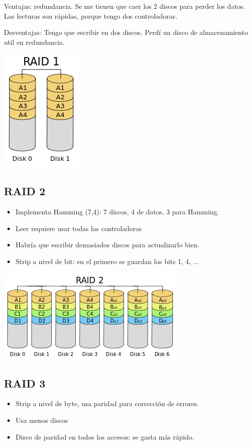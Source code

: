 Ventajas: redundancia. Se me tienen que caer los 2 discos para perder los datos. Las lecturas son rápidas, porque tengo dos controladoras.


Desventajas: Tengo que escribir en dos discos. Perdí un disco de almacenamiento util en redundancia.

\includegraphics[scale=0.82]{imagenes/raid1}

\subsection{RAID 2}
\begin{itemize}
\item Implementa Hamming (7,4): 7 discos, 4 de datos, 3 para Hamming.
\item Leer requiere usar todas las controladoras
\item Habría que escribir demasiados discos para actualizarlo bien.
\item Strip a nivel de bit: en el primero se guardan los bits 1, 4, ...
\end{itemize}

\includegraphics[scale=1]{imagenes/raid2}

\subsection{RAID 3}

\begin{itemize}
\item Strip a nivel de byte, usa paridad para corrección de errores.
\item Usa menos discos
\item Disco de paridad en todos los accesos: se gasta más rápido.
\end{itemize}

